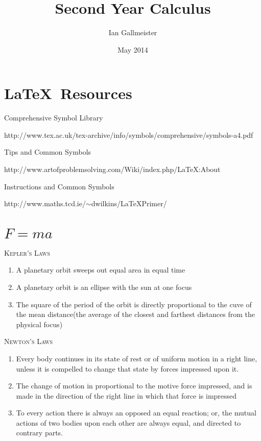 \documentclass{article}
\title{Second Year Calculus}
\author{Ian Gallmeister}
\date{May 2014}
\begin{document}
\maketitle

\section{\LaTeX\ Resources}

Comprehensive Symbol Library

\smallskip

http://www.tex.ac.uk/tex-archive/info/symbols/comprehensive/symbols-a4.pdf

\bigskip

Tips and Common Symbols

\smallskip

http://www.artofproblemsolving.com/Wiki/index.php/LaTeX:About

\bigskip

Instructions and Common Symbols

\smallskip

http://www.maths.tcd.ie/$\sim$dwilkins/LaTeXPrimer/

\section{$F = ma$}

\bigskip

\textsc{Kepler's Laws}

\begin{enumerate}
\item 
A planetary orbit sweeps out equal area in equal time
\item
A planetary orbit is an ellipse with the sun at one focus
\item
The square of the period of the orbit is directly proportional to the cuve of the mean distance(the average of the closest and farthest distances from the physical focus)
\end{enumerate}

\bigskip

\textsc{Newton's Laws}

\begin{enumerate}
\item 
Every body continues in its state of rest or of uniform motion in a right line, unless it is compelled to change that state by forces impressed upon it.
\item
The change of motion in proportional to the motive force impressed, and is made in the direction of the right line in which that force is impressed
\item
To every action there is always an opposed an equal reaction; or, the mutual actions of two bodies upon each other are always equal, and directed to contrary parts.
\end{enumerate}
\end{document}
